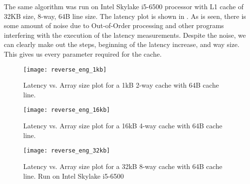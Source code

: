 The same algorithm was run on Intel Skylake i5-6500 processor with L1 cache of
32KB size, 8-way, 64B line size. The latency plot is shown in
. As is seen, there is some amount of noise due to
Out-of-Order processing and other programs interfering with the execution of
the latency measurements. Despite the noise, we can clearly make out the
steps, beginning of the latency increase, and way size. This gives us every
parameter required for the cache.

\begin{figure}[h]
\centering
\texttt{[image: reverse\_eng\_1kb]}
\caption[1KB cache stride access]{Latency vs. Array size plot
    for a 1kB 2-way cache with 64B cache line.}
\label{fig:gem5_cache}
\end{figure}

\begin{figure}[h]
\centering
\texttt{[image: reverse\_eng\_16kb]}
\caption[1KB cache stride access]{Latency vs. Array size plot
    for a 16kB 4-way cache with 64B cache line.}
\label{fig:gem5_cache2}
\end{figure}

\begin{figure}[h]
\centering
\texttt{[image: reverse\_eng\_32kb]}
\caption[1KB cache stride access]{Latency vs. Array size plot
    for a 32kB 8-way cache with 64B cache line. Run on Intel Skylake i5-6500}
\label{fig:x86_cache}
\end{figure}

